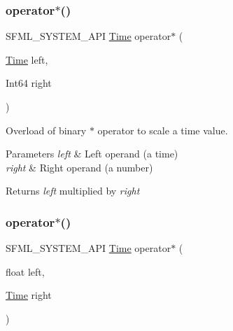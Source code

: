 \subsubsection{\texorpdfstring{operator$\ast$()}{operator*()}\hspace{0.1cm}{\footnotesize\ttfamily [2/4]}}
{\footnotesize\ttfamily S\+F\+M\+L\+\_\+\+S\+Y\+S\+T\+E\+M\+\_\+\+A\+PI \mbox{\hyperlink{classsf_1_1_time}{Time}} operator$\ast$ (\begin{DoxyParamCaption}\item[{\mbox{\hyperlink{classsf_1_1_time}{Time}}}]{left,  }\item[{Int64}]{right }\end{DoxyParamCaption})\hspace{0.3cm}{\ttfamily [related]}}



Overload of binary $\ast$ operator to scale a time value. 


\begin{DoxyParams}{Parameters}
{\em left} & Left operand (a time) \\
\hline
{\em right} & Right operand (a number)\\
\hline
\end{DoxyParams}
\begin{DoxyReturn}{Returns}
{\itshape left} multiplied by {\itshape right} \begin{DoxyVerb}\end{DoxyVerb}
 
\end{DoxyReturn}
\mbox{\label{classsf_1_1_time_a63723c9e9c5ff6151377ec4350c6f36e}} 
\subsubsection{\texorpdfstring{operator$\ast$()}{operator*()}\hspace{0.1cm}{\footnotesize\ttfamily [3/4]}}
{\footnotesize\ttfamily S\+F\+M\+L\+\_\+\+S\+Y\+S\+T\+E\+M\+\_\+\+A\+PI \mbox{\hyperlink{classsf_1_1_time}{Time}} operator$\ast$ (\begin{DoxyParamCaption}\item[{float}]{left,  }\item[{\mbox{\hyperlink{classsf_1_1_time}{Time}}}]{right }\end{DoxyParamCaption})\hspace{0.3cm}{\ttfamily [related]}}



